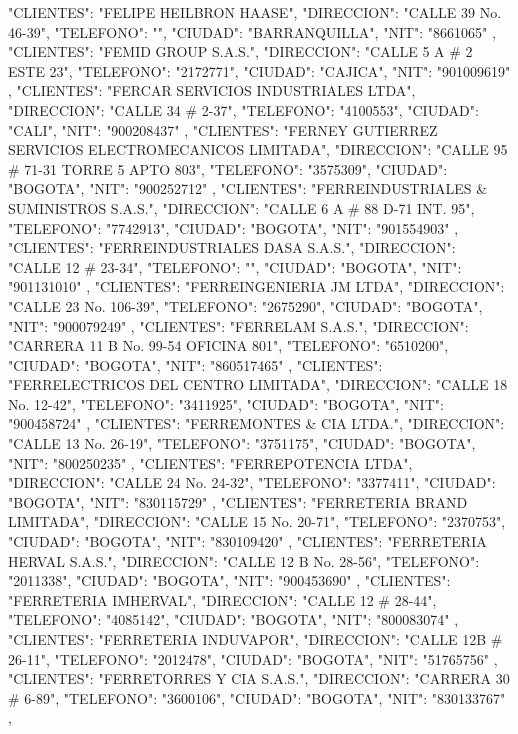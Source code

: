    {
   "CLIENTES": "FELIPE HEILBRON HAASE",
   "DIRECCION": "CALLE 39 No. 46-39",
   "TELEFONO": "",
   "CIUDAD": "BARRANQUILLA",
   "NIT": "8661065"
   },
   {
   "CLIENTES": "FEMID GROUP S.A.S.",
   "DIRECCION": "CALLE 5 A # 2 ESTE 23",
   "TELEFONO": "2172771",
   "CIUDAD": "CAJICA",
   "NIT": "901009619"
   },
   {
   "CLIENTES": "FERCAR SERVICIOS INDUSTRIALES LTDA",
   "DIRECCION": "CALLE 34 # 2-37",
   "TELEFONO": "4100553",
   "CIUDAD": "CALI",
   "NIT": "900208437"
   },
   {
   "CLIENTES": "FERNEY GUTIERREZ SERVICIOS ELECTROMECANICOS LIMITADA",
   "DIRECCION": "CALLE 95 # 71-31 TORRE 5 APTO 803",
   "TELEFONO": "3575309",
   "CIUDAD": "BOGOTA",
   "NIT": "900252712"
   },
   {
   "CLIENTES": "FERREINDUSTRIALES & SUMINISTROS S.A.S.",
   "DIRECCION": "CALLE 6 A # 88 D-71 INT. 95",
   "TELEFONO": "7742913",
   "CIUDAD": "BOGOTA",
   "NIT": "901554903"
   },
   {
   "CLIENTES": "FERREINDUSTRIALES DASA S.A.S.",
   "DIRECCION": "CALLE 12 # 23-34",
   "TELEFONO": "",
   "CIUDAD": "BOGOTA",
   "NIT": "901131010"
   },
   {
   "CLIENTES": "FERREINGENIERIA JM LTDA",
   "DIRECCION": "CALLE 23 No. 106-39",
   "TELEFONO": "2675290",
   "CIUDAD": "BOGOTA",
   "NIT": "900079249"
   },
   {
   "CLIENTES": "FERRELAM S.A.S.",
   "DIRECCION": "CARRERA 11 B No. 99-54 OFICINA 801",
   "TELEFONO": "6510200",
   "CIUDAD": "BOGOTA",
   "NIT": "860517465"
   },
   {
   "CLIENTES": "FERRELECTRICOS DEL CENTRO LIMITADA",
   "DIRECCION": "CALLE 18 No. 12-42",
   "TELEFONO": "3411925",
   "CIUDAD": "BOGOTA",
   "NIT": "900458724"
   },
   {
   "CLIENTES": "FERREMONTES & CIA LTDA.",
   "DIRECCION": "CALLE 13 No. 26-19",
   "TELEFONO": "3751175",
   "CIUDAD": "BOGOTA",
   "NIT": "800250235"
   },
   {
   "CLIENTES": "FERREPOTENCIA LTDA",
   "DIRECCION": "CALLE 24 No. 24-32",
   "TELEFONO": "3377411",
   "CIUDAD": "BOGOTA",
   "NIT": "830115729"
   },
   {
   "CLIENTES": "FERRETERIA BRAND LIMITADA",
   "DIRECCION": "CALLE 15 No. 20-71",
   "TELEFONO": "2370753",
   "CIUDAD": "BOGOTA",
   "NIT": "830109420"
   },
   {
   "CLIENTES": "FERRETERIA HERVAL S.A.S.",
   "DIRECCION": "CALLE 12 B No. 28-56",
   "TELEFONO": "2011338",
   "CIUDAD": "BOGOTA",
   "NIT": "900453690"
   },
   {
   "CLIENTES": "FERRETERIA IMHERVAL",
   "DIRECCION": "CALLE 12 # 28-44",
   "TELEFONO": "4085142",
   "CIUDAD": "BOGOTA",
   "NIT": "800083074"
   },
   {
   "CLIENTES": "FERRETERIA INDUVAPOR",
   "DIRECCION": "CALLE 12B # 26-11",
   "TELEFONO": "2012478",
   "CIUDAD": "BOGOTA",
   "NIT": "51765756"
   },
   {
   "CLIENTES": "FERRETORRES Y CIA S.A.S.",
   "DIRECCION": "CARRERA 30 # 6-89",
   "TELEFONO": "3600106",
   "CIUDAD": "BOGOTA",
   "NIT": "830133767"
   },
